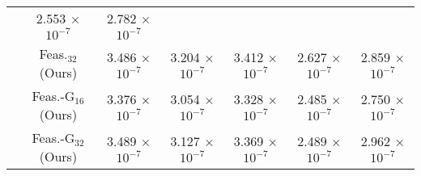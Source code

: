 \begin{table*}[t]
{\begin{tabular}{ccccccc}
& 2.553 \(\times\) \(10^{-7}\) & 2.782 \(\times\) \(10^{-7}\) \\
& Feas.$_{32}$ (Ours) & 3.486 \(\times\) \(10^{-7}\) & 3.204 \(\times\) \(10^{-7}\) & 3.412 \(\times\) \(10^{-7}\)
& 2.627 \(\times\) \(10^{-7}\) & 2.859 \(\times\) \(10^{-7}\) \\
& Feas.-G$_{16}$ (Ours) & 3.376 \(\times\) \(10^{-7}\) & 3.054 \(\times\) \(10^{-7}\) & 3.328 \(\times\) \(10^{-7}\)
& 2.485 \(\times\) \(10^{-7}\) & 2.750 \(\times\) \(10^{-7}\) \\
& Feas.-G$_{32}$ (Ours) & 3.489 \(\times\) \(10^{-7}\) & 3.127 \(\times\) \(10^{-7}\) & 3.369 \(\times\) \(10^{-7}\)
& 2.489 \(\times\) \(10^{-7}\) & 2.962 \(\times\) \(10^{-7}\) \\

\bottomrule

\end{tabular}
}
\end{table*}


 




